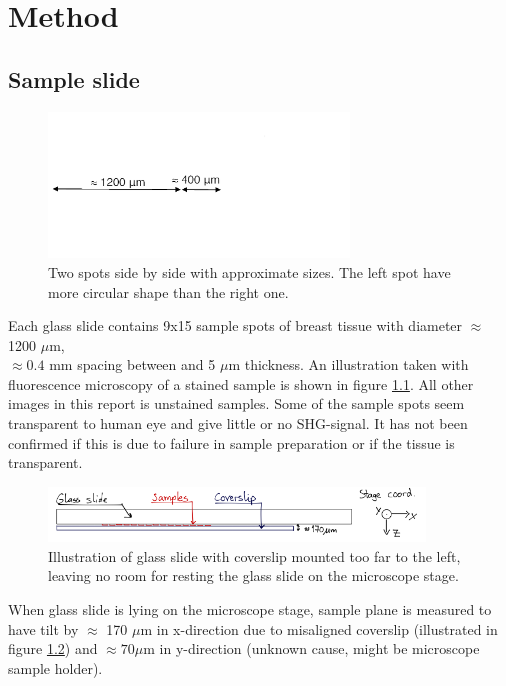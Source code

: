 \chapter{Method}

%
%
\section{Sample slide}

\begin{figure}[h]
\centering
\includegraphics[width=8cm]{spots}
\caption{Two spots side by side with approximate sizes. The left spot have more circular shape than the right one. }
\label{fig:spots}
\end{figure}

Each glass slide contains 9x15 sample spots of breast tissue with diameter $\approx$ 1200 $\mu$m, \\ $\approx 0.4$ mm spacing between and 5 $\mu$m thickness. An illustration taken with fluorescence microscopy of a stained sample is shown in figure \ref{fig:spots}. All other images in this report is unstained samples. Some of the sample spots seem transparent to human eye and give little or no SHG-signal. It has not been confirmed if this is due to failure in sample preparation or if the tissue is transparent.

\begin{figure}[h]
\centering
\includegraphics[width=10cm]{tilt}
\caption{Illustration of glass slide with coverslip mounted too far to the left, leaving no room for resting the glass slide on the microscope stage.}
\label{fig:tilt}
\end{figure}

When glass slide is lying on the microscope stage, sample plane is measured to have tilt by $\approx$ 170  $\mu$m in x-direction due to misaligned coverslip (illustrated in figure \ref{fig:tilt}) and $\approx 70 \mu$m in y-direction (unknown cause, might be microscope sample holder).


